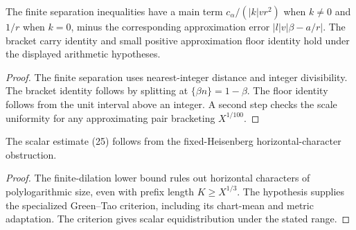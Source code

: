 \begin{lemma}\label{checked-floor}
\leanok
The finite separation inequalities have a main term
$c_\alpha/(|k|vr^2)$ when $k\ne0$ and $1/r$ when $k=0$,
minus the corresponding approximation error $|l|v|\beta-a/r|$.
The bracket carry identity and small positive approximation
floor identity hold under the displayed arithmetic hypotheses.
\end{lemma}
\begin{proof}
\leanok
The finite separation uses nearest-integer distance and integer
divisibility. The bracket identity follows by splitting at
$\{\beta n\}=1-\beta$. The floor identity follows from the
unit interval above an integer. A second step checks the scale
uniformity for any approximating pair bracketing $X^{1/100}$.
\end{proof}

\begin{lemma}\label{checked-scalar}
\leanok
The scalar estimate (25) follows from the fixed-Heisenberg
horizontal-character obstruction.
\end{lemma}
\begin{proof}
\leanok
The finite-dilation lower bound rules out horizontal characters
of polylogarithmic size, even with prefix length $K\ge X^{1/3}$.
The hypothesis supplies the specialized Green--Tao criterion,
including its chart-mean and metric adaptation. The criterion
gives scalar equidistribution under the stated range.
\end{proof}

